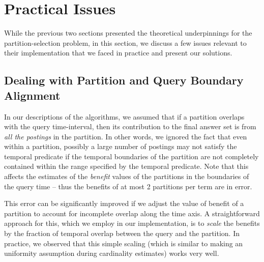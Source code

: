 \section{Practical Issues}
While the previous two sections presented the theoretical
underpinnings for the partition-selection problem, in this section, we discuss a few
issues relevant to their implementation that we faced in practice and
present our solutions.


\subsection{Dealing with Partition and Query Boundary Alignment}
In our descriptions of the algorithms, we assumed that if a partition
overlaps with the query time-interval, then its contribution to the final
answer set is from \emph{all the postings} in the partition. In other
words, we ignored the fact that even within a partition, possibly a
large number of postings may not satisfy the temporal predicate if
the temporal boundaries of the partition are not completely contained
within the range specified by the temporal predicate. Note that this
affects the estimates of the \emph{benefit} values of the partitions
in the boundaries of the query time -- thus the benefits of at most 2 partitions per term are in error.

This error can be significantly improved if we adjust the value of
benefit of a partition to account for incomplete overlap along the
time axis. A straightforward approach for this, which we employ in our
implementation, is to \emph{scale} the benefits by the fraction of
temporal overlap between the query and the partition. In practice,
we observed that this simple scaling (which is similar to making an uniformity assumption during cardinality estimates) works very well.


